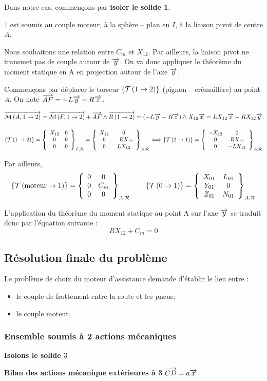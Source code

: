 \documentclass[11pt,oneside]{article}
\begin{document}
Dans notre cas, commençons par \textbf{isoler le solide 1}.

$1$ est soumis au couple moteur, à la sphère -- plan en $I$, à la liaison pivot de centre $A$.

Nous souhaitons une relation entre $C_m$ et $X_{12}$. Par ailleurs, la liaison pivot ne transmet pas de couple autour de $\vect{y}$. On va donc appliquer le théorème du moment statique en A en projection autour de l'axe $\vect{y}$.

Commençons par déplacer le torseur $\torseurstat{T}{1}{2}$ (pignon -- crémaillère) au point $A$. On note $\vect{AF}=-L\vect{y}-R\vect{z}$.


$$
\vectm{A}{1}{2} = \vectm{F}{1}{2} + \vect{AF}\wedge\vectf{1}{2} 
= \left(-L\vect{y}-R\vect{z}\right) \wedge X_{12} \vect{x}
=LX_{12}\vect{z}-RX_{12}\vect{y}
$$

$$
\torseurstat{T}{1}{2} 
=\torseurcol{X_{12}}{0}{0}{0}{0}{0}{F,\mathcal{R}}
=\torseurcol{X_{12}}{0}{0}{0}{-RX_{12}}{LX_{12}}{A,\mathcal{R}}
\Longleftrightarrow
\torseurstat{T}{2}{1} 
=\torseurcol{-X_{12}}{0}{0}{0}{RX_{12}}{-LX_{12}}{A,\mathcal{R}}
$$

Par ailleurs, 
$$
\torseurstat{T}{\text{moteur}}{1}=
\torseurcol{0}{0}{0}{0}{C_m}{0}{A,\mathcal{R}}
 \quad \quad
\torseurstat{T}{0}{1} =
\torseurcol{X_{01}}{Y_{01}}{Z_{01}}{L_{01}}{0}{N_{01}}{A,\mathcal{R}}
$$


L'application du théorème du moment statique au point A sur l'axe $\vect{y}$ se traduit donc par l'équation suivante :
$$
R X_{12} + C_m = 0
$$




\subsection{Résolution finale du problème}
Le problème de choix du moteur d'assistance demande d'établir le lien entre :
\begin{itemize}
\item le couple de frottement entre la route et les pneus;
\item le couple moteur.
\end{itemize}

\subsubsection*{Ensemble soumis à 2 actions mécaniques}
\textbf{Isolons le solide $3$}

\textbf{Bilan des actions mécanique extérieures à 3}
$\vect{CD}=a\vect{x}$
\end{document}
